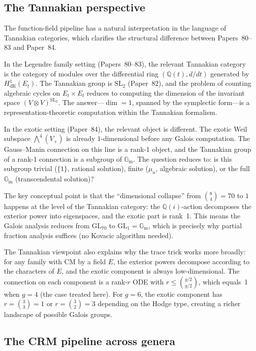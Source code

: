 \documentclass[11pt]{article}
\theoremstyle{plain}
\theoremstyle{definition}
\theoremstyle{remark}
\newcommand{\Q}{\mathbb{Q}}
\newcommand{\GL}{\mathrm{GL}}
\newcommand{\SL}{\mathrm{SL}}
\newcommand{\Gm}{\mathbb{G}_{\mathrm{m}}}
\begin{document}
\subsection{The Tannakian perspective}

The function-field pipeline has a natural interpretation in the language
of Tannakian categories, which clarifies the structural difference between
Papers~80--83 and Paper~84.

In the Legendre family setting (Papers~80--83), the relevant Tannakian
category is the category of modules over the differential ring
$(\Q(t), d/dt)$ generated by $H^1_{\mathrm{dR}}(E_t)$. The Tannakian
group is $\SL_2$ (Paper~82), and the problem of counting algebraic cycles
on $E_t \times E_t$ reduces to computing the dimension of the invariant
space $(V \otimes V)^{\SL_2}$. The answer---$\dim = 1$, spanned by the
symplectic form---is a representation-theoretic computation within the
Tannakian formalism.

In the exotic setting (Paper~84), the relevant object is different. The
exotic Weil subspace $\bigwedge^4(V_+)$ is already $1$-dimensional
before any Galois computation. The Gauss--Manin connection on this
line is a rank-1 object, and the Tannakian group of a rank-1 connection
is a subgroup of $\Gm$. The question reduces to: is this subgroup
trivial ($\{1\}$, rational solution), finite ($\mu_n$, algebraic solution),
or the full $\Gm$ (transcendental solution)?

The key conceptual point is that the ``dimensional collapse'' from
$\binom{8}{4} = 70$ to $1$ happens at the level of the Tannakian
category: the $\Q(i)$-action decomposes the exterior power into
eigenspaces, and the exotic part is rank~1. This means the Galois
analysis reduces from $\GL_{70}$ to $\GL_1 = \Gm$, which is precisely
why partial fraction analysis suffices (no Kovacic algorithm needed).

The Tannakian viewpoint also explains why the trace trick works more
broadly: for any family with CM by a field $E$, the exterior powers
decompose according to the characters of $E$, and the exotic
component is always low-dimensional. The connection on each component
is a rank-$r$ ODE with $r \leq \binom{g/2}{g/2}$, which equals~1
when $g = 4$ (the case treated here). For $g = 6$, the exotic component
has $r = \binom{3}{3} = 1$ or $r = \binom{3}{2} = 3$ depending on the
Hodge type, creating a richer landscape of possible Galois groups.

\subsection{The CRM pipeline across genera}
\end{document}

